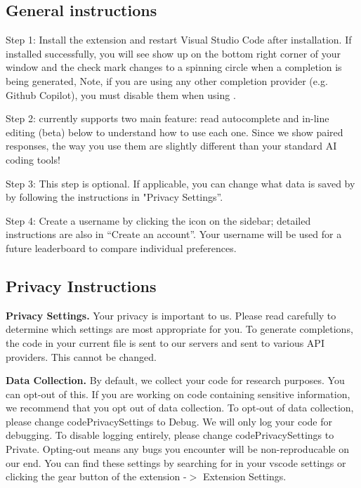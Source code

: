 \subsection{General instructions}


Step 1: Install the extension and restart Visual Studio Code after installation.
If installed successfully, you will see \systemName show up on the bottom right corner of your window and the check mark changes to a spinning circle when a completion is being generated,
Note, if you are using any other completion provider (e.g. Github Copilot), you must disable them when using \systemName.

Step 2: \systemName currently supports two main feature: read autocomplete and in-line editing (beta) below to understand how to use each one. Since we show paired responses, the way you use them are slightly different than your standard AI coding tools!

Step 3: This step is optional. If applicable, you can change what data is saved by \systemName by following the instructions in "Privacy Settings''.

Step 4: Create a username by clicking the \systemName icon on the sidebar; detailed instructions are also in ``Create an account''. Your username will be used for a future leaderboard to compare individual preferences.



\subsection{Privacy Instructions}

\textbf{Privacy Settings.} Your privacy is important to us. Please read carefully to determine which settings are most appropriate for you.
To generate completions, the code in your current file is sent to our servers and sent to various API providers. This cannot be changed.

\textbf{Data Collection.} By default, we collect your code for research purposes. You can opt-out of this. If you are working on code containing sensitive information, we recommend that you opt out of data collection.
To opt-out of data collection, please change codePrivacySettings to Debug. We will only log your code for debugging.
To disable logging entirely, please change codePrivacySettings to Private. Opting-out means any bugs you encounter will be non-reproducable on our end.
You can find these settings by searching for \systemName in your vscode settings or clicking the gear button of the \systemName extension -$>$ Extension Settings.

